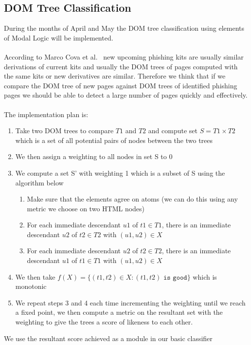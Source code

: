 \subsection{DOM Tree Classification}
During the months of April and May the DOM tree classification using elements of Modal Logic will be implemented.
\\\\
According to Marco Cova et al.~\cite{freephish} new upcoming phishing kits are usually similar derivations of current kits and usually the DOM trees of pages computed with the same kits or new derivatives are similar. Therefore we think that if we compare the DOM tree of new pages against DOM trees of identified phishing pages we should be able to detect a large number of pages quickly and effectively.
\\\\
The implementation plan is:
\begin{enumerate}[label*=\arabic*.]
  \item Take two DOM trees to compare $T1$ and $T2$ and compute set $S = T1 \times T2$ which is a set of all potential pairs of nodes between the two trees
  \item We then assign a weighting to all nodes in set S to 0
  \item We compute a set S' with weighting 1 which is a subset of S using the algorithm below
  \begin{enumerate}[label*=\arabic*.]
    \item Make sure that the elements agree on atoms (we can do this using any metric we choose on two HTML nodes)
    \item For each immediate descendant $u1$ of $t1 \in T1$, there is an immediate descendant $u2$ of $t2 \in T2$ with $(u1,u2) \in X$
    \item For each immediate descendant $u2$ of $t2 \in T2$, there is an immediate descendant $u1$ of $t1 \in T1$ with $(u1,u2) \in X$
  \end{enumerate}
  \item We then take $f(X) = \{(t1, t2) \in X:(t1,t2) \texttt{ is good}\}$ which is monotonic
  \item We repeat steps 3 and 4 each time incrementing the weighting until we reach a fixed point, we then compute a metric on the resultant set with the weighting to give the trees a score of likeness to each other.
\end{enumerate}
We use the resultant score achieved as a module in our basic classifier
